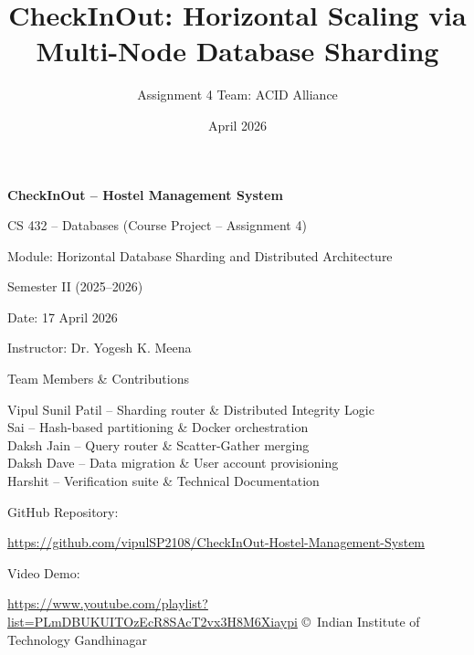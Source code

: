 \documentclass[sigconf]{acmart}
\title{CheckInOut: Horizontal Scaling via Multi-Node Database Sharding}
\author{Assignment 4 Team: ACID Alliance}
\affiliation{%
  \institution{Indian Institute of Technology Gandhinagar}
  \city{Gandhinagar}
  \country{India}
}
\date{April 2026}
\begin{document}
\begin{titlepage}
    \centering
    \vspace*{2cm}
    {\Huge\bfseries CheckInOut -- Hostel Management System\par}
    \vspace{1cm}
    {\Large CS 432 -- Databases (Course Project -- Assignment 4)\par}
    \vspace{0.5cm}
    {\large Module: Horizontal Database Sharding and Distributed Architecture\par}
    \vspace{1.5cm}
    {\large Semester II (2025--2026)\par}
    \vspace{0.5cm}
    {\large Date: 17 April 2026\par}
    \vfill
    {\large Instructor: Dr. Yogesh K. Meena\par}
    \vspace{1cm}
    {\large Team Members \& Contributions\par}
    \vspace{0.5cm}
    Vipul Sunil Patil -- Sharding router \& Distributed Integrity Logic\\
    Sai -- Hash-based partitioning \& Docker orchestration\\
    Daksh Jain -- Query router \& Scatter-Gather merging\\
    Daksh Dave -- Data migration \& User account provisioning\\
    Harshit -- Verification suite \& Technical Documentation\\
    \vspace{1cm}
    {\large GitHub Repository:\par}
    \vspace{0.1cm}
    {\small \url{https://github.com/vipulSP2108/CheckInOut-Hostel-Management-System}}

    \vspace{0.3cm}
    {\large Video Demo:\par}
    \vspace{0.1cm}
    {\small \url{https://www.youtube.com/playlist?list=PLmDBUKUITOzEcR8SAcT2vx3H8M6Xiaypi}}
    \vfill
    {\small \copyright\ Indian Institute of Technology Gandhinagar}
\end{titlepage}

\setcounter{page}{1}
\end{document}
